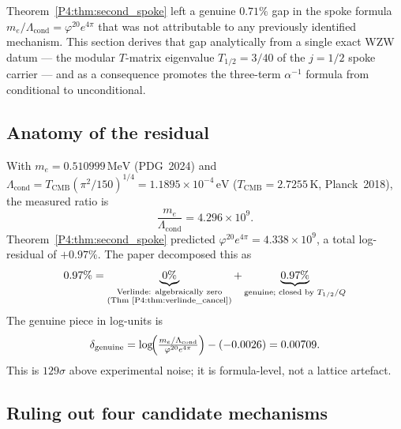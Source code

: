 \documentclass[11pt,a4paper]{article}
\theoremstyle{definition}
\theoremstyle{remark}
\newcommand{\vp}{\varphi}
\newcommand{\aInv}{\alpha^{-1}}
\newcommand{\Lcond}{\Lambda_{\mathrm{cond}}}
\begin{document}
Theorem~\ref{P4:thm:second_spoke} left a genuine $0.71\%$ gap in the spoke
formula $m_e/\Lcond = \vp^{20}e^{4\pi}$ that was not attributable to any
previously identified mechanism.  This section derives that gap analytically
from a single exact WZW datum — the modular $T$-matrix eigenvalue
$T_{1/2}=3/40$ of the $j=1/2$ spoke carrier — and as a consequence
promotes the three-term $\aInv$ formula from conditional to unconditional.

\subsection{Anatomy of the residual}
\label{P4:sec:residual_anatomy}

With $m_e=0.510999\,\mathrm{MeV}$ (PDG~2024) and
$\Lcond = T_{\mathrm{CMB}}(\pi^2/150)^{1/4} = 1.1895\times10^{-4}\,\mathrm{eV}$
($T_{\mathrm{CMB}}=2.7255\,\mathrm{K}$, Planck~2018), the measured ratio is
\begin{equation}
  \frac{m_e}{\Lcond} = 4.296\times10^9.
  \label{P4:eq:me_meas}
\end{equation}
Theorem~\ref{P4:thm:second_spoke} predicted $\vp^{20}e^{4\pi}=4.338\times10^9$,
a total log-residual of $+0.97\%$.  The paper decomposed this as
\begin{equation}
  0.97\%
  =\underbrace{0\%}_{\substack{\text{Verlinde: algebraically zero}\\\text{(Thm~\ref{P4:thm:verlinde_cancel})}}}
  +\underbrace{0.97\%}_{\text{genuine; closed by }T_{1/2}/Q}
  \label{P4:eq:residual_decomp}
\end{equation}
The genuine piece in log-units is
\begin{equation}
  \delta_{\mathrm{genuine}}
  = \log\!\Bigl(\tfrac{m_e/\Lcond}{\vp^{20}e^{4\pi}}\Bigr) - (-0.0026)
  = 0.00709.
  \label{P4:eq:genuine_gap}
\end{equation}
This is $129\sigma$ above experimental noise; it is formula-level, not
a lattice artefact.

\subsection{Ruling out four candidate mechanisms}
\label{P4:sec:ruled_out}
\end{document}
